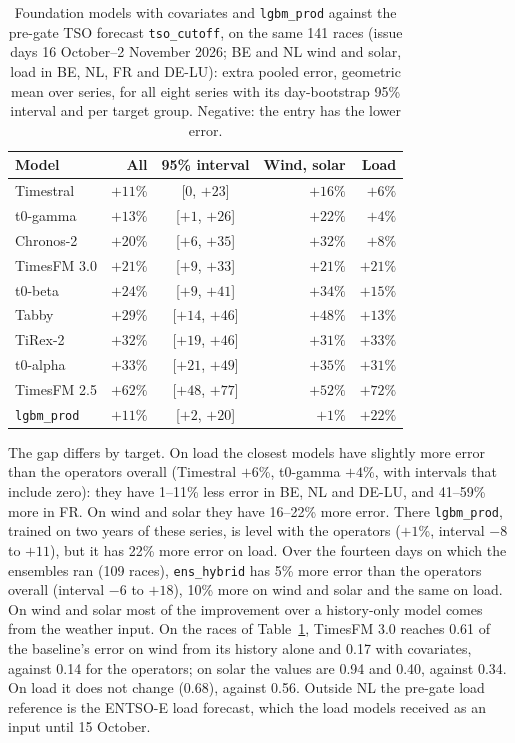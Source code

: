 \documentclass[11pt,a4paper]{article}
\newcommand{\m}[1]{\texttt{#1}}
\begin{document}
\begin{table}[t]
\centering\small
\caption{Foundation models with covariates and \m{lgbm\_prod} against the pre-gate TSO forecast \m{tso\_cutoff}, on the
same 141 races (issue days 16 October--2 November 2026; BE and NL wind and solar, load in BE, NL, FR and DE-LU): extra pooled
error, geometric mean over series, for all eight series with its day-bootstrap 95\% interval and per target group.
Negative: the entry has the lower error.}
\label{tab:tsogap}
\begin{tabular}{@{}lrcrr@{}}
\toprule
Model & All & 95\% interval & Wind, solar & Load \\
\midrule
Timestral & $+11\%$ & [$0$, $+23$] & $+16\%$ & $+6\%$ \\
t0-gamma & $+13\%$ & [$+1$, $+26$] & $+22\%$ & $+4\%$ \\
Chronos-2 & $+20\%$ & [$+6$, $+35$] & $+32\%$ & $+8\%$ \\
TimesFM 3.0 & $+21\%$ & [$+9$, $+33$] & $+21\%$ & $+21\%$ \\
t0-beta & $+24\%$ & [$+9$, $+41$] & $+34\%$ & $+15\%$ \\
Tabby & $+29\%$ & [$+14$, $+46$] & $+48\%$ & $+13\%$ \\
TiRex-2 & $+32\%$ & [$+19$, $+46$] & $+31\%$ & $+33\%$ \\
t0-alpha & $+33\%$ & [$+21$, $+49$] & $+35\%$ & $+31\%$ \\
TimesFM 2.5 & $+62\%$ & [$+48$, $+77$] & $+52\%$ & $+72\%$ \\
\midrule
\m{lgbm\_prod} & $+11\%$ & [$+2$, $+20$] & $+1\%$ & $+22\%$ \\
\bottomrule
\end{tabular}
\end{table}

The gap differs by target. On load the closest models have slightly more error than the operators overall
(Timestral $+6$\%, t0-gamma $+4$\%, with intervals that include zero): they have 1--11\% less error in BE, NL and
DE-LU, and 41--59\% more in FR. On wind and solar they have 16--22\% more error. There \m{lgbm\_prod}, trained on two
years of these series, is level with the operators ($+1$\%, interval $-8$ to $+11$), but it has 22\% more error on
load. Over the fourteen days on which the ensembles ran (109 races), \m{ens\_hybrid} has 5\% more error than the
operators overall (interval $-6$ to $+18$), 10\% more on wind and solar and the same on load. On wind and solar most of the improvement over a history-only model comes from the weather
input. On the races of Table~\ref{tab:tsogap}, TimesFM 3.0 reaches 0.61 of the baseline's error on wind from its history
alone and 0.17 with covariates, against 0.14 for the operators; on solar the values are 0.94 and 0.40, against 0.34. On
load it does not change (0.68), against 0.56. Outside NL the pre-gate load reference is the ENTSO-E load
forecast, which the load models received as an input until 15 October.
\end{document}
